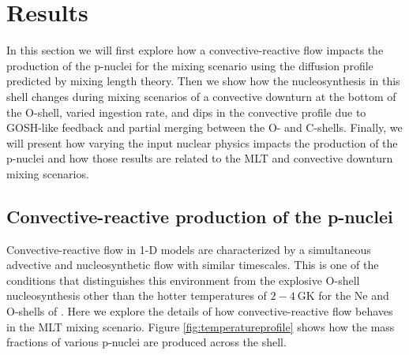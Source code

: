 \section{Results} \label{sec:results}

In this section we will first explore how a convective-reactive flow impacts the production of the p-nuclei for the mixing scenario using the diffusion profile predicted by mixing length theory.
Then we show how the nucleosynthesis in this shell changes during mixing scenarios of a convective downturn at the bottom of the O-shell, varied ingestion rate, and dips in the convective profile due to GOSH-like feedback and partial merging between the O- and C-shells.
Finally, we will present how varying the input nuclear physics impacts the production of the p-nuclei and how those results are related to the MLT and convective downturn mixing scenarios.

\subsection{Convective-reactive production of the p-nuclei} \label{sec:convreacflow}

Convective-reactive flow in 1-D models are characterized by a simultaneous advective and nucleosynthetic flow with similar timescales.
This is one of the conditions that distinguishes this environment from the explosive O-shell nucleosynthesis other than the hotter temperatures of $2-4~\mathrm{GK}$ for the Ne and O-shells of \cite{robertiGprocessNucleosynthesisCorecollapse2024b}.
Here we explore the details of how convective-reactive flow behaves in the MLT mixing scenario.
Figure \ref{fig:temperatureprofile} shows how the mass fractions of various p-nuclei are produced across the shell.

